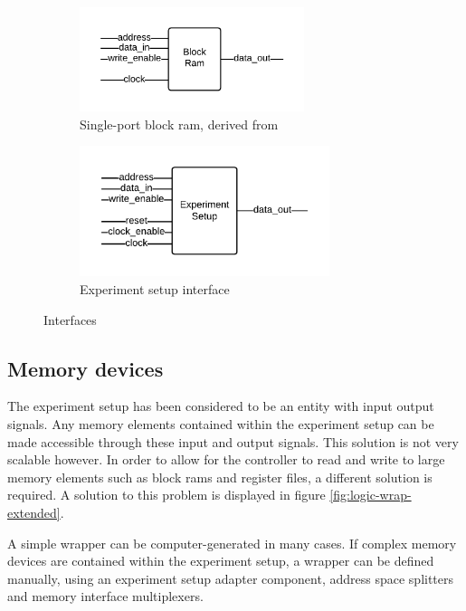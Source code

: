\documentclass[openright]{template/uva-bachelor-thesis}
\begin{document}
\begin{figure}[h]
    \centering
    \begin{subfigure}[t]{0.5\textwidth}
        \centering
        \includegraphics[height=1.2in]{img/interface-bram}
        \caption{Single-port block ram, derived from \cite{RAMs68}}
        \label{fig:interface-bram}
    \end{subfigure}%
    \begin{subfigure}[t]{0.5\textwidth}
        \centering
        \includegraphics[height=1.5in]{img/interface-experiment}
        \caption{Experiment setup interface}
        \label{fig:interface-experiment}
    \end{subfigure}
    \caption{Interfaces}
    \label{fig:interfaces}
\end{figure}


\subsection{Memory devices}

The experiment setup has been considered to be an entity with input output signals. Any memory elements contained within the experiment setup can be made accessible through these input and output signals. This solution is not very scalable however. In order to allow for the controller to read and write to large memory elements such as block rams and register files, a different solution is required. A solution to this problem is displayed in figure \ref{fig:logic-wrap-extended}. 

A simple wrapper can be computer-generated in many cases. If complex memory devices are contained within the experiment setup, a wrapper can be defined manually, using an experiment setup adapter component, address space splitters and memory interface multiplexers. 
\end{document}
